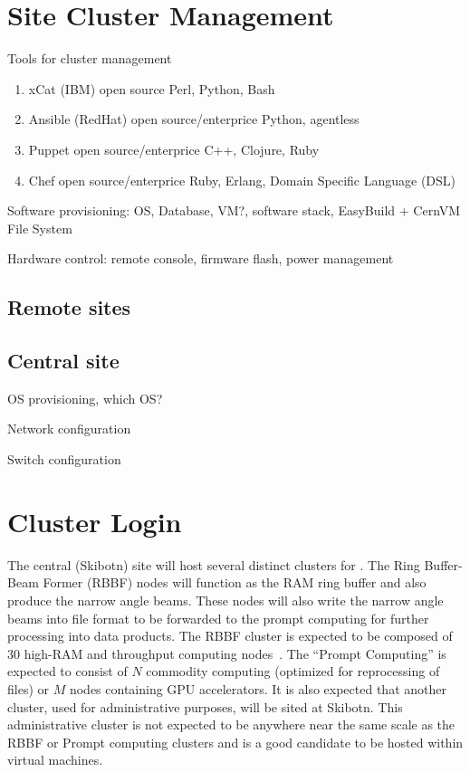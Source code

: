 \documentclass[12pt,a4paper]{article}
\begin{document}
\section{Site Cluster Management}

Tools for cluster management

\begin{enumerate}
    \item xCat (IBM) open source  Perl, Python, Bash
    \item Ansible (RedHat) open source/enterprice Python, agentless
    \item Puppet open source/enterprice  C++, Clojure, Ruby
    \item Chef open source/enterprice Ruby, Erlang, Domain Specific Language (DSL) 
\end{enumerate}

Software provisioning: OS, Database, VM?, software stack, EasyBuild + CernVM File System

Hardware control: remote console, firmware flash, power management

\subsection{Remote sites}

\subsection{Central site}

OS provisioning, which OS?

Network configuration

Switch configuration


\section{Cluster Login}
\label{sec:cluster}

The central (Skibotn) site will host several distinct clusters for \ED.
The Ring Buffer-Beam Former (RBBF) nodes will function as the RAM ring buffer and also produce the narrow angle beams.
These nodes will also write the narrow angle beams into file format to be forwarded to the prompt computing for further processing into data products.
The RBBF cluster is expected to be composed of $30$ high-RAM and throughput computing nodes~\cite{amd-epyc}.
The ``Prompt Computing'' is expected to consist of $N$ commodity computing (optimized for reprocessing of files) or $M$ nodes containing
GPU accelerators.
It is also expected that another cluster, used for administrative purposes, will be sited at Skibotn.
This administrative cluster is not expected to be anywhere near the same scale as the RBBF or Prompt computing clusters
and is a good candidate to be hosted within virtual machines.
\end{document}
